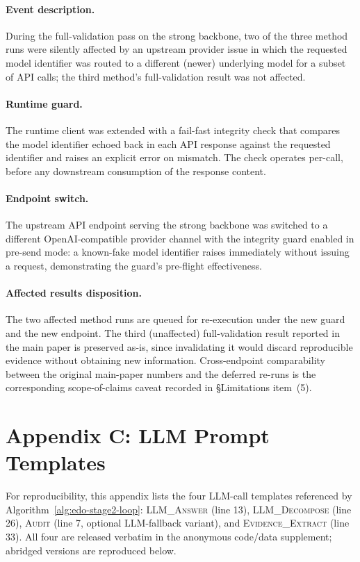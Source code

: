 \paragraph{Event description.} During the full-validation pass on the strong backbone, two of the three method runs were silently affected by an upstream provider issue in which the requested model identifier was routed to a different (newer) underlying model for a subset of API calls; the third method's full-validation result was not affected.

\paragraph{Runtime guard.} The runtime client was extended with a fail-fast integrity check that compares the model identifier echoed back in each API response against the requested identifier and raises an explicit error on mismatch. The check operates per-call, before any downstream consumption of the response content.

\paragraph{Endpoint switch.} The upstream API endpoint serving the strong backbone was switched to a different OpenAI-compatible provider channel with the integrity guard enabled in pre-send mode: a known-fake model identifier raises immediately without issuing a request, demonstrating the guard's pre-flight effectiveness.

\paragraph{Affected results disposition.} The two affected method runs are queued for re-execution under the new guard and the new endpoint. The third (unaffected) full-validation result reported in the main paper is preserved as-is, since invalidating it would discard reproducible evidence without obtaining new information. Cross-endpoint comparability between the original main-paper numbers and the deferred re-runs is the corresponding scope-of-claims caveat recorded in \S Limitations item~(5).

\section*{Appendix C: LLM Prompt Templates}
\label{sec:appendix-c}

For reproducibility, this appendix lists the four LLM-call templates referenced by Algorithm~\ref{alg:edo-stage2-loop}: \textsc{LLM\_Answer} (line 13), \textsc{LLM\_Decompose} (line 26), \textsc{Audit} (line 7, optional LLM-fallback variant), and \textsc{Evidence\_Extract} (line 33). All four are released verbatim in the anonymous code/data supplement; abridged versions are reproduced below.


